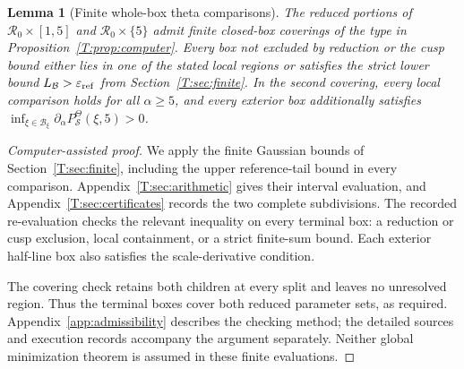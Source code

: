 \documentclass[reqno,english]{amsart}
\newtheorem{lemma}[theorem]{Lemma}
\theoremstyle{definition}
\newtheorem{open problem}[theorem]{Open Problem}
\theoremstyle{remark}
\theoremstyle{plain}
\numberwithin{equation}{section}
\begin{document}
\begin{lemma}[Finite whole-box theta comparisons]\label{hyp:theta}
The reduced portions of $\mathcal R_0\times[1,5]$ and
$\mathcal R_0\times\{5\}$ admit finite closed-box coverings of the type
in Proposition~\ref{T:prop:computer}. Every box not excluded by reduction
or the cusp bound either lies in one of the stated local regions or
satisfies the strict lower bound
$L_{\mathcal B}>\varepsilon_{\rm ref}$ from
Section~\ref{T:sec:finite}. In the second covering, every local comparison
holds for all $\alpha\ge5$, and every exterior box additionally satisfies
$\inf_{\xi\in\mathcal B_\xi}\partial_\alpha
P^\Theta_{\mathcal S}(\xi,5)>0$.
\end{lemma}
\begin{proof}[Computer-assisted proof]
We apply the finite Gaussian bounds of Section~\ref{T:sec:finite},
including the upper reference-tail bound in every comparison.
Appendix~\ref{T:sec:arithmetic} gives their interval evaluation,
and Appendix~\ref{T:sec:certificates} records the two complete
subdivisions. The recorded re-evaluation checks the relevant inequality
on every terminal box: a reduction or cusp exclusion, local
containment, or a strict finite-sum bound. Each exterior half-line box
also satisfies the scale-derivative condition.

The covering check retains both children at every split and leaves no
unresolved region. Thus the terminal boxes cover both reduced
parameter sets, as required. Appendix~\ref{app:admissibility}
describes the checking method; the detailed sources and execution
records accompany the argument separately. Neither global
minimization theorem is assumed in these finite evaluations.
\end{proof}
\end{document}
